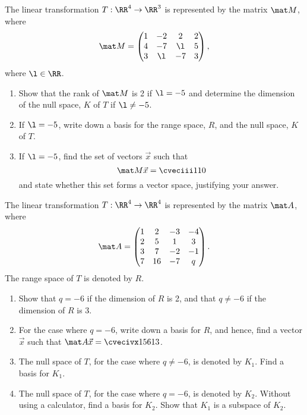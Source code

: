 \begin{problem}
    The linear transformation $T : \RR^4 \to \RR^3$ is represented by the matrix $\mat M$, where \[\mat M = \begin{pmatrix}1 & -2 & 2 & 2 \\ 4 & -7 & \l & 5 \\ 3 & \l & -7 & 3\end{pmatrix},\] where $\l \in \RR$.

    \begin{enumerate}
        \item Show that the rank of $\mat M$ is 2 if $\l = -5$ and determine the dimension of the null space, $K$ of $T$ if $\l \neq -5$.
        \item If $\l = -5$, write down a basis for the range space, $R$, and the null space, $K$ of $T$.
        \item If $\l = -5$, find the set of vectors $\vec x$ such that \[\mat M \vec x = \cveciii110\] and state whether this set forms a vector space, justifying your answer.
    \end{enumerate}
\end{problem}

\begin{problem}
    The linear transformation $T : \RR^4 \to \RR^4$ is represented by the matrix $\mat A$, where \[\mat A = \begin{pmatrix}1 & 2 & -3 & -4 \\ 2 & 5 & 1 & 3 \\ 3 & 7 & -2 & -1 \\ 7 & 16 & -7 & q\end{pmatrix}.\] The range space of $T$ is denoted by $R$.

    \begin{enumerate}
        \item Show that $q = -6$ if the dimension of $R$ is 2, and that $q \neq -6$ if the dimension of $R$ is 3.
        \item For the case where $q = -6$, write down a basis for $R$, and hence, find a vector $\vec x$ such that $\mat A \vec x = \cvecivx156{13}$.
        \item The null space of $T$, for the case where $q \neq -6$, is denoted by $K_1$. Find a basis for $K_1$.
        \item The null space of $T$, for the case where $q = -6$, is denoted by $K_2$. Without using a calculator, find a basis for $K_2$. Show that $K_1$ is a subspace of $K_2$.
    \end{enumerate}
\end{problem}

